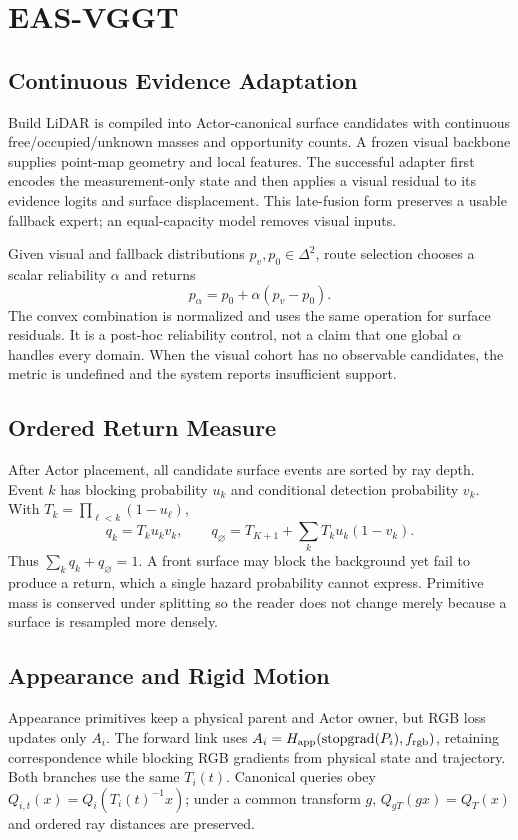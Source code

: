 \section{EAS-VGGT}
\subsection{Continuous Evidence Adaptation}
Build LiDAR is compiled into Actor-canonical surface candidates with continuous
free/occupied/unknown masses and opportunity counts. A frozen visual backbone supplies
point-map geometry and local features. The successful adapter first encodes the
measurement-only state and then applies a visual residual to its evidence logits and
surface displacement. This late-fusion form preserves a usable fallback expert; an
equal-capacity model removes visual inputs.

Given visual and fallback distributions $p_v,p_0\in\Delta^2$, route selection chooses
a scalar reliability $\alpha$ and returns
\[
p_{\alpha}=p_0+\alpha(p_v-p_0).
\]
The convex combination is normalized and uses the same operation for surface residuals.
It is a post-hoc reliability control, not a claim that one global $\alpha$ handles every
domain. When the visual cohort has no observable candidates, the metric is undefined
and the system reports insufficient support.

\subsection{Ordered Return Measure}
After Actor placement, all candidate surface events are sorted by ray depth. Event $k$
has blocking probability $u_k$ and conditional detection probability $v_k$. With
$T_k=\prod_{\ell<k}(1-u_\ell)$,
\[
q_k=T_k u_k v_k,\qquad
q_{\varnothing}=T_{K+1}+\sum_k T_k u_k(1-v_k).
\]
Thus $\sum_k q_k+q_{\varnothing}=1$. A front surface may block the background yet fail
to produce a return, which a single hazard probability cannot express. Primitive mass
is conserved under splitting so the reader does not change merely because a surface is
resampled more densely.

\subsection{Appearance and Rigid Motion}
Appearance primitives keep a physical parent and Actor owner, but RGB loss updates only
$A_i$. The forward link uses $A_i=H_{\rm app}(\operatorname{stopgrad}(P_i),f_{\rm
rgb})$, retaining correspondence while blocking RGB gradients from physical state and
trajectory. Both branches use the same $T_i(t)$. Canonical queries obey
$Q_{i,t}(x)=Q_i(T_i(t)^{-1}x)$; under a common transform $g$,
$Q_{gT}(gx)=Q_T(x)$ and ordered ray distances are preserved.
